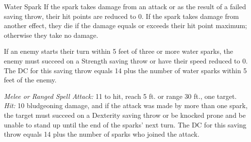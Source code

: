\documentclass[10pt,a4paper,twoside,bg=print,twocolumn,openany,nodeprecatedcode]{dndbook}
\begin{document}
\begin{DndMonster}[float=t]{Water Spark}
\DndMonsterBasics[
armor-class = {19 (natural armor)},
hit-points = {\DndDice{27}},
speed = {30 ft., swim 50 ft., fly 30 ft.}
]
\DndMonsterAbilityScores[
 str = 20,
 dex = 18,
 con = 16,
 int = 9,
 wis = 16,
 cha = 11
]
\DndMonsterDetails[
senses = {darkvision 60 ft., passive perception 13},
languages = {Aquan, Common},
challenge = 20,
]
If the spark takes damage from an attack or as the result of a failed saving throw, their hit points are reduced to 0. If the spark takes damage from another effect, they die if the damage equals or exceeds their hit point maximum; otherwise they take no damage.

If an enemy starts their turn within 5 feet of three or more water sparks, the enemy must succeed on a Strength saving throw or have their speed reduced to 0. The DC for this saving throw equals 14 plus the number of water sparks within 5 feet of the enemy.

\textsl{Melee or Ranged Spell Attack:} 11 to hit, reach 5 ft. or range 30 ft., one target. \textsl{Hit:} 10 bludgeoning damage, and if the attack was made by more than one spark, the target must succeed on a Dexterity saving throw or be knocked prone and be unable to stand up until the end of the sparks' next turn. The DC for this saving throw equals 14 plus the number of sparks who joined the attack.

\end{DndMonster}


\clearpage
\end{document}
